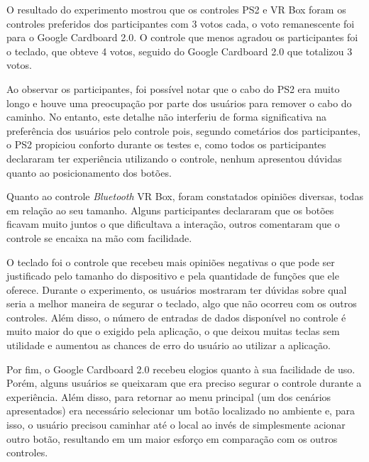 O resultado do experimento mostrou que os controles PS2 e VR Box foram os controles preferidos dos participantes com 3 votos cada, o voto remanescente foi para o Google Cardboard 2.0. O controle que menos agradou os participantes foi o teclado, que obteve 4 votos, seguido do Google Cardboard 2.0 que totalizou 3 votos.

Ao observar os participantes, foi possível notar que o cabo do PS2 era muito longo e houve uma preocupação por parte dos usuários para remover o cabo do caminho. No entanto, este detalhe não interferiu de forma significativa na preferência dos usuários pelo controle pois, segundo cometários dos participantes, o PS2 propiciou conforto durante os testes e, como todos os participantes declararam ter experiência utilizando o controle, nenhum apresentou dúvidas quanto ao posicionamento dos botões.

Quanto ao controle \textit{Bluetooth} VR Box, foram constatados opiniões diversas, todas em relação ao seu tamanho. Alguns participantes declararam que os botões ficavam muito juntos o que dificultava a interação, outros comentaram que o controle se encaixa na mão com facilidade.

O teclado foi o controle que recebeu mais opiniões negativas o que pode ser justificado pelo tamanho do dispositivo e pela quantidade de funções que ele oferece. Durante o experimento, os usuários mostraram ter dúvidas sobre qual seria a melhor maneira de segurar o teclado, algo que não ocorreu com os outros controles. Além disso, o número de entradas de dados disponível no controle é muito maior do que o exigido pela aplicação, o que deixou muitas teclas sem utilidade e aumentou as chances de erro do usuário ao utilizar a aplicação. 

Por fim, o Google Cardboard 2.0 recebeu elogios quanto à sua facilidade de uso. Porém, alguns usuários se queixaram que era preciso segurar o controle durante a experiência. Além disso, para retornar ao menu principal (um dos cenários apresentados) era necessário selecionar um botão localizado no ambiente e, para isso, o usuário precisou caminhar até o local ao invés de simplesmente acionar outro botão, resultando em um maior esforço em comparação com os outros controles.  
  
